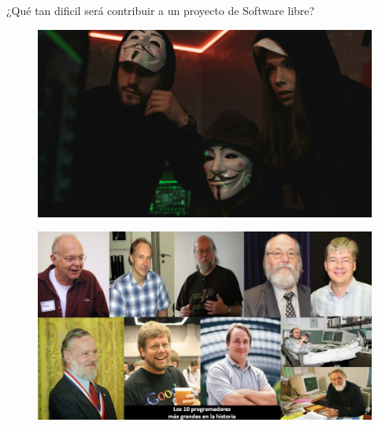 \documentclass{beamer}
\begin{document}
\begin{frame}
  \centering
    \Huge ¿Qué tan dificil será contribuir a un proyecto de Software libre?
\end{frame}

\begin{frame}
	\begin{figure}
		\centering
		\includegraphics[width=1\linewidth]{images/hackers.jpg}
		\label{fig:debian}
	\end{figure}
\end{frame}
\begin{frame}
	\begin{figure}
		\centering
		\includegraphics[width=1\linewidth]{images/coders.jpg}
		\label{fig:debian}
	\end{figure}
\end{frame}
\end{document}
